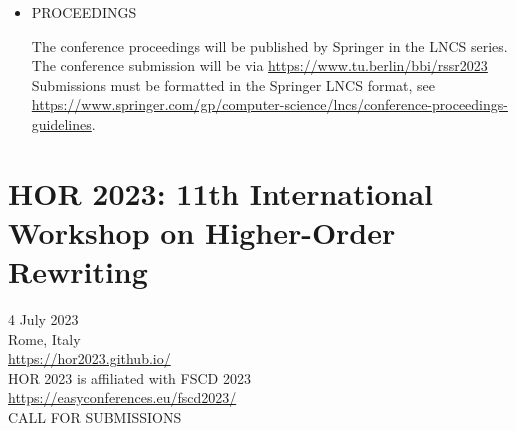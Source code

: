 \documentclass[prodmode,acmtecs]{acmsmall} %
\begin{document}
\begin{itemize}
\item  PROCEEDINGS 
 
  The conference proceedings will be published by Springer in the LNCS series. The conference submission will be via \href{https://www.tu.berlin/bbi/rssr2023}{https://www.tu.berlin/bbi/rssr2023} Submissions must be formatted in the Springer LNCS format, see \href{https://www.springer.com/gp/computer-science/lncs/conference-proceedings-guidelines}{https://www.springer.com/gp/computer-science/lncs/conference-proceedings-guidelines}. 
 
\end{itemize}\section{HOR 2023: 11th International Workshop on Higher-Order Rewriting}\label{HOR2023}   4 July 2023\\ 
   Rome, Italy\\ 
   \href{https://hor2023.github.io/}{https://hor2023.github.io/}\\ 
   HOR 2023 is affiliated with FSCD 2023\\ 
   \href{https://easyconferences.eu/fscd2023/}{https://easyconferences.eu/fscd2023/}\\ 
CALL FOR SUBMISSIONS 
\end{document}
